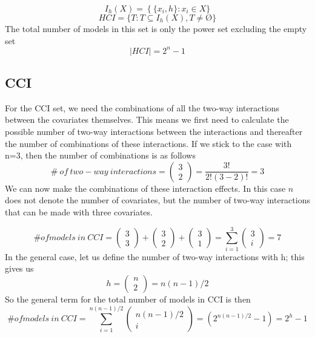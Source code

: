 \[I_h(X)=\left.\left\{\{x_i,h\}\right.:x_i\in X\right.\}\] 
\[HCI=\left.\{T:T\subseteq I_h\left(X\right),T\neq \textrm{\O}\right.\}\] 
The total number of models in this set is only the power set excluding the empty set
\[\left|HCI\right|\boldsymbol{=}2^n-1\] 

\subsection{CCI}

For the CCI set, we need the combinations of all the two-way interactions between the covariates themselves. This means we first need to calculate the possible number of two-way interactions between the interactions and thereafter the number of combinations of these interactions. If we stick to the case with n=3, then the number of combinations is as follows
\[\#\ of\ two-way\ interactions=\left( \begin{array}{c}
3 \\ 
2 \end{array}
\right)=\frac{3!}{2!\left(3-2\right)!}=3\] 
We can now make the combinations of these interaction effects. In this case $n$ does not denote the number of covariates, but the number of two-way interactions that can be made with three covariates.  

\noindent 
\[\# of models\ in\ CCI=\left( \begin{array}{c}
3 \\ 
3 \end{array}
\right)+\left( \begin{array}{c}
3 \\ 
2 \end{array}
\right)+\left( \begin{array}{c}
3 \\ 
1 \end{array}
\right)=\sum^3_{i=1}{\left( \begin{array}{c}
3 \\ 
i \end{array}
\right)}=7\] 
In the general case, let us define the number of two-way interactions with h; this gives us
\[h=\left( \begin{array}{c}
n \\ 
2 \end{array}
\right)=n(n-1)/2\] 
So the general term for the total number of models in CCI is then
\[\# of models\ in\ CCI=\sum^{n(n-1)/2}_{i=1}{\left( \begin{array}{c}
n(n-1)/2 \\ 
i \end{array}
\right)}=(2^{n(n-1)/2}-1)=2^h-1\] 


